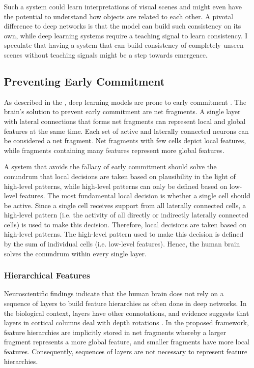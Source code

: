 Such a system could learn interpretations of visual scenes and might even have the potential to understand how objects are related to each other. A pivotal difference to deep networks is that the model can build such consistency on its own, while deep learning systems require a teaching signal to learn consistency.
I speculate that having a system that can build consistency of completely unseen scenes without teaching signals might be a step towards emergence.


\subsection{Preventing Early Commitment}
As described in the , deep learning models are prone to early commitment .
The brain's solution to prevent early commitment are net fragments.
A single layer with lateral connections that forms net fragments can represent local and global features at the same time.
Each set of active and laterally connected neurons can be considered a net fragment. Net fragments with few cells depict local features, while fragments containing many features represent more global features.

A system that avoids the fallacy of early commitment should solve the conundrum that local decisions are taken based on plausibility in the light of high-level patterns, while high-level patterns can only be defined based on low-level features.
The most fundamental local decision is whether a single cell should be active. Since a single cell receives support from all laterally connected cells, a high-level pattern (i.e. the activity of all directly or indirectly laterally connected cells) is used to make this decision. Therefore, local decisions are taken based on high-level patterns. The high-level pattern used to make this decision is defined by the sum of individual cells (i.e. low-level features). Hence, the human brain solves the conundrum within every single layer.


\subsubsection{Hierarchical Features}
Neuroscientific findings indicate that the human brain does not rely on a sequence of layers to build feature hierarchies as often done in deep networks.
In the biological context, layers have other connotations, and evidence suggests that layers in cortical columns deal with depth rotations .
In the proposed framework, feature hierarchies are implicitly stored in net fragments whereby a larger fragment represents a more global feature, and smaller fragments have more local features.
Consequently, sequences of layers are not necessary to represent feature hierarchies.

